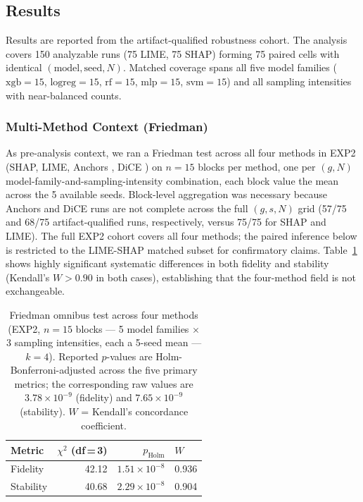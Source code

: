 \documentclass[twoside,11pt]{article}
\begin{document}
\subsection{Results}
\label{sec:results}

Results are reported from the artifact-qualified robustness cohort. The
analysis covers 150 analyzable runs (75 LIME, 75 SHAP) forming 75 paired
cells with identical $(\mathrm{model}, \mathrm{seed}, N)$. Matched
coverage spans all five model families ($\mathrm{xgb}=15$,
$\mathrm{logreg}=15$, $\mathrm{rf}=15$, $\mathrm{mlp}=15$,
$\mathrm{svm}=15$) and all sampling intensities with near-balanced counts.

\subsubsection*{Multi-Method Context (Friedman)}

As pre-analysis context, we ran a Friedman test across all four methods
in EXP2 (SHAP, LIME, Anchors \citep{ribeiro2018anchors}, DiCE
\citep{mothilal2020dice}) on $n=15$ blocks per method, one per $(g,N)$
model-family-and-sampling-intensity combination, each block value the mean
across the 5 available seeds. Block-level aggregation was necessary because
Anchors and DiCE runs are not complete across the full $(g,s,N)$ grid (57/75
and 68/75 artifact-qualified runs, respectively, versus 75/75 for SHAP and
LIME). The full EXP2 cohort covers all four
methods; the paired inference below is restricted to the LIME-SHAP matched
subset for confirmatory claims. Table~\ref{tab:friedman}
shows highly significant systematic differences in both fidelity and
stability (Kendall's $W > 0.90$ in both cases), establishing that the
four-method field is not exchangeable.

\begin{table}[t]
\centering
\caption{Friedman omnibus test across four methods (EXP2, $n=15$ blocks ---
5 model families $\times$ 3 sampling intensities, each a 5-seed mean ---
$k=4$). Reported $p$-values are Holm-Bonferroni-adjusted across the five
primary metrics; the corresponding raw values are
$3.78\times10^{-9}$ (fidelity) and $7.65\times10^{-9}$ (stability).
$W$ = Kendall's concordance coefficient.}
\label{tab:friedman}
\begin{tabular}{lrrl}
\toprule
Metric    & $\chi^2$ (df\,=\,3) & $p_{\mathrm{Holm}}$   & $W$   \\
\midrule
Fidelity  & 42.12               & $1.51\times10^{-8}$  & 0.936 \\
Stability & 40.68               & $2.29\times10^{-8}$  & 0.904 \\
\bottomrule
\end{tabular}
\end{table}
\end{document}
